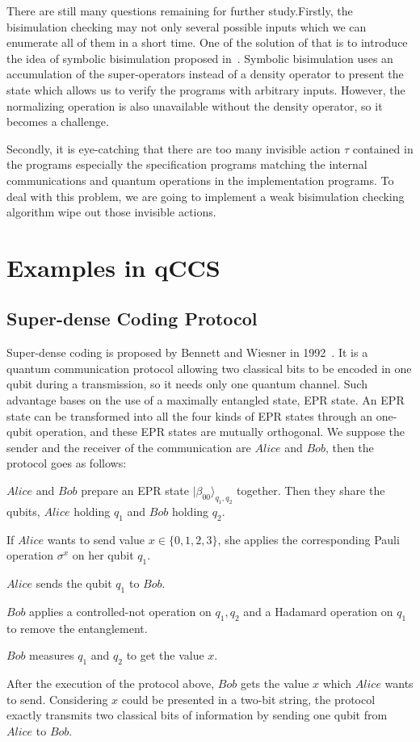\documentclass[a4paper,UKenglish,cleveref, autoref]{lipics-v2019}
\begin{document}
There are still many questions remaining for further study.Firstly, the bisimulation checking may not only several possible inputs which we can enumerate all of them in a short time. One of the solution of that is to introduce the idea of symbolic bisimulation proposed in~\cite{FDY14}. Symbolic bisimulation uses an accumulation of the super-operators instead of a density operator to present the state which allows us to verify the programs with arbitrary inputs. However, the normalizing operation is also unavailable without the density operator, so it becomes a challenge.

Secondly, it is eye-catching that there are too many invisible action $\tau$ contained in the programs especially the specification programs matching the internal communications and quantum operations in the implementation programs. To deal with this problem, we are going to implement a weak bisimulation checking algorithm wipe out those invisible actions. 






\appendix

\section{Examples in qCCS}
\subsection{Super-dense Coding Protocol}
Super-dense coding is proposed by Bennett and Wiesner in 1992~\cite{BW92}. It is a quantum communication protocol allowing two classical bits to be encoded in one qubit during a transmission, so it needs only one quantum channel. Such advantage bases on the use of a maximally
entangled state, EPR state. An EPR state can be transformed into all the four kinds of EPR states through an one-qubit operation, and these EPR states are mutually orthogonal. We suppose the sender and the receiver of the communication are $Alice$ and $Bob$, then the protocol goes as follows:
\begin{bracketenumerate}
    \item $Alice$ and $Bob$ prepare an EPR state $|\beta_{00}\rangle_{q_1,q_2}$ together. Then they share the qubits, $Alice$ holding $q_1$ and $Bob$ holding $q_2$.
    \item If $Alice$ wants to send value $x\in \{0,1,2,3\}$, she applies the corresponding Pauli operation $\sigma^{x}$ on her qubit $q_1$.
    \item $Alice$ sends the qubit $q_1$ to $Bob$.
    \item $Bob$ applies a controlled-not operation on $q_1,q_2$ and a Hadamard operation on $q_1$ to remove the entanglement.
    \item $Bob$ measures $q_1$ and $q_2$ to get the value $x$.
\end{bracketenumerate}
After the execution of the protocol above, $Bob$ gets the value $x$ which $Alice$ wants to send. Considering $x$ could be presented in a two-bit string, the protocol exactly transmits two classical bits of information by sending one qubit from $Alice$ to $Bob$.
\end{document}
